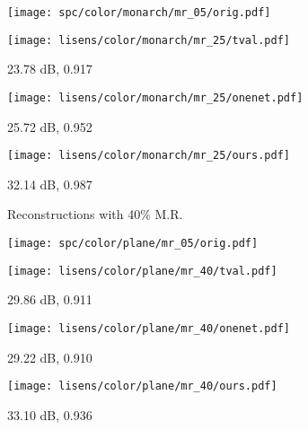 \documentclass[journal,twoside]{IEEEtran}
\begin{document}
\begin{figure*}[t]
\begin{minipage}{.98\textwidth}
\begin{minipage}{.20\textwidth}
\vspace{0.04cm}
\texttt{[image: spc/color/monarch/mr\_05/orig.pdf]}  
\centerline{}
\end{minipage}\hspace{0.1cm}
\begin{minipage}{.20\textwidth}
\vspace{0.04cm}
\texttt{[image: lisens/color/monarch/mr\_25/tval.pdf]}  
\centerline{ 23.78 dB, 0.917}
\end{minipage}\hspace{0.1cm}
\begin{minipage}{.20\textwidth}
\vspace{0.1cm}
\texttt{[image: lisens/color/monarch/mr\_25/onenet.pdf]}  
\centerline{ 25.72 dB, 0.952}
\end{minipage}\hspace{0.1cm}
\begin{minipage}{.20\textwidth}
\vspace{0.1cm}
\texttt{[image: lisens/color/monarch/mr\_25/ours.pdf]}  
\centerline{ 32.14 dB, 0.987}
\end{minipage}
\end{minipage}

\centerline{}
\centerline{}

\begin{minipage}{.01\textwidth}
\raggedleft
\begin{turn}{90}Reconstructions with 40\% M.R. \end{turn}
\end{minipage}
\begin{minipage}{.98\textwidth}
\centering
\begin{minipage}{.20\textwidth}
\vspace{0.01cm}
\texttt{[image: spc/color/plane/mr\_05/orig.pdf]}  
\centerline{}
\end{minipage}\hspace{0.1cm}
\begin{minipage}{.20\textwidth}
\vspace{0.01cm}
\texttt{[image: lisens/color/plane/mr\_40/tval.pdf]}  
\centerline{ 29.86 dB, 0.911}
\end{minipage}\hspace{0.1cm}
\begin{minipage}{.20\textwidth}
\vspace{0.1cm}
\texttt{[image: lisens/color/plane/mr\_40/onenet.pdf]}  
\centerline{ 29.22 dB, 0.910}
\end{minipage}\hspace{0.1cm}
\begin{minipage}{.20\textwidth}
\vspace{0.1cm}
\texttt{[image: lisens/color/plane/mr\_40/ours.pdf]}  
\centerline{ 33.10 dB, 0.936}
\end{minipage}


\end{minipage}
\end{figure*}
\end{document}
